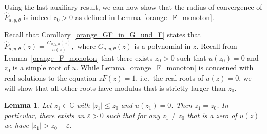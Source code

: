 \documentclass[12pt]{article}
\newcommand{\C}{\mathbb{C}} %
\newcommand{\1}{\mathds{1}}
\theoremstyle{definition}
\theoremstyle{plain}
\newtheorem{Lemma}[definition]{Lemma}
\theoremstyle{remark}
\begin{document}
Using the last auxiliary result, we can now show that the radius of convergence of $\hat P_{a,y,\theta}$ is indeed $z_0>0$ as defined in Lemma~\ref{orange_F_monoton}.

Recall that Corollary~\ref{orange_GF_in_G_und_F} states that
$\hat P_{a,y,\theta}(z) = \frac{G_{a,y,\theta}(z)}{u(z)},
$
where $G_{a,y,\theta}(z)$ is a polynomial in $z$. Recall from Lemma~\ref{orange_F_monoton} that there exists $z_0>0$ such that $u(z_0)=0$ and $z_0$ is a simple root of $u$. While Lemma~\ref{orange_F_monoton} is concerned with real solutions to the equation $zF(z)=1$, i.e.\ the real roots of $u(z)=0$, we will show that all other roots have modulus that is strictly larger than $z_0$.

\begin{Lemma} \label{lem:analyticityofremovedu}
Let $z_1\in\C$ with $|z_1|\leq z_0$ and $u(z_1)=0$. Then $z_1=z_0$. In particular, there exists an $\varepsilon>0$ such that for any $z_1\neq z_0$ that is a zero of $u(z)$ we have $|z_1|>z_0+\varepsilon$.
\end{Lemma}
\end{document}
